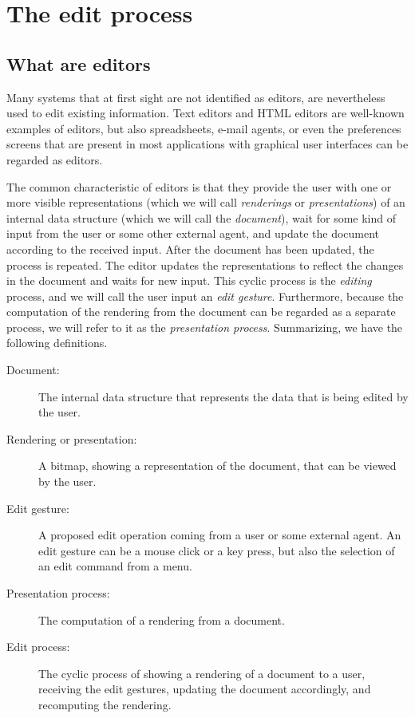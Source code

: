 \documentclass[twoside,epsf]{report}
\begin{document}
\section{The edit process}
\label{problem}

{\bf }
\subsection{What are editors}


{\bf }Many systems that at first sight are not identified as editors, are nevertheless used to edit existing information. Text editors and HTML editors are well-known examples of editors, but also spreadsheets, e-mail agents, or even the preferences screens that are present in most applications with graphical user interfaces can be regarded as editors. 

The common characteristic of editors is that they provide the user with one or more visible representations (which we will call {\em renderings} or {\em presentations}) of an internal data structure (which we will call the {\em document}), wait for some kind of input from the user or some other external agent, and update the document according to the received input. After the document has been updated, the process is repeated. The editor updates the representations to reflect the changes in the document and waits for new input. This cyclic process is the {\em editing} process, and we will call the user input an {\em edit gesture}. Furthermore, because the computation of the rendering from the document can be regarded as a separate process, we will refer to it as the {\em presentation process}. Summarizing, we have the following definitions.
 \begin{description}
 
 \item[Document:]
 The internal data structure that represents the data that is being
          edited by the user.
 \item[Rendering or presentation: ]
 A bitmap, showing a representation of the document, that can be
          viewed by the user.
 \item[Edit gesture:]
A proposed edit operation coming from a user or some external
          agent. An edit gesture can be a mouse click or a key press, but also the
          selection of an edit command from a menu.
 \item[Presentation process:]
The computation of a rendering from a document.
 \item[Edit process:]
The cyclic process of showing a rendering of a document to a user,
          receiving the edit gestures, updating the document accordingly, and recomputing
          the rendering.
 \end{description}
\end{document}
